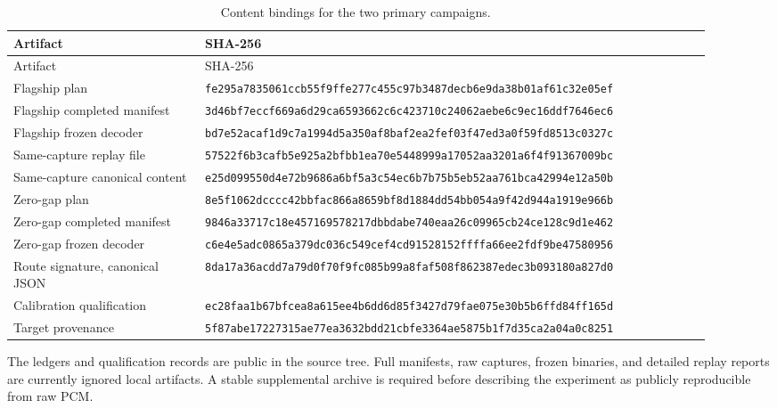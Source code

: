 \documentclass[11pt]{article}
\newcommand{\hash}[2]{\texttt{#1}\allowbreak\texttt{#2}}
\begin{document}
\begin{longtable}{p{0.25\linewidth}p{0.66\linewidth}}
\caption{Content bindings for the two primary campaigns.}\label{tab:hashes}\\
\toprule
Artifact & SHA-256 \\
\midrule
\endfirsthead
\toprule
Artifact & SHA-256 \\
\midrule
\endhead
Flagship plan &
\hash{fe295a7835061ccb55f9ffe277c455c}{97b3487decb6e9da38b01af61c32e05ef} \\
Flagship completed manifest &
\hash{3d46bf7eccf669a6d29ca6593662c6c4}{23710c24062aebe6c9ec16ddf7646ec6} \\
Flagship frozen decoder &
\hash{bd7e52acaf1d9c7a1994d5a350af8ba}{f2ea2fef03f47ed3a0f59fd8513c0327c} \\
Same-capture replay file &
\hash{57522f6b3cafb5e925a2bfbb1ea70e54}{48999a17052aa3201a6f4f91367009bc} \\
Same-capture canonical content &
\hash{e25d099550d4e72b9686a6bf5a3c54e}{c6b7b75b5eb52aa761bca42994e12a50b} \\
Zero-gap plan &
\hash{8e5f1062dcccc42bbfac866a8659bf8d}{1884dd54bb054a9f42d944a1919e966b} \\
Zero-gap completed manifest &
\hash{9846a33717c18e457169578217dbbdabe}{740eaa26c09965cb24ce128c9d1e462} \\
Zero-gap frozen decoder &
\hash{c6e4e5adc0865a379dc036c549cef4cd}{91528152ffffa66ee2fdf9be47580956} \\
Route signature, canonical JSON &
\hash{8da17a36acdd7a79d0f70f9fc085b99}{a8faf508f862387edec3b093180a827d0} \\
Calibration qualification &
\hash{ec28faa1b67bfcea8a615ee4b6dd6d85}{f3427d79fae075e30b5b6ffd84ff165d} \\
Target provenance &
\hash{5f87abe17227315ae77ea3632bdd21cbf}{e3364ae5875b1f7d35ca2a04a0c8251} \\
\bottomrule
\end{longtable}

The ledgers and qualification records are public in the source tree. Full
manifests, raw captures, frozen binaries, and detailed replay reports are
currently ignored local artifacts. A stable supplemental archive is required
before describing the experiment as publicly reproducible from raw PCM.
\end{document}
